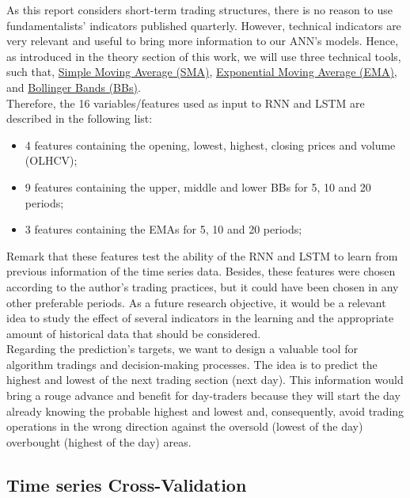 As this report considers short-term trading structures, there is no reason to use fundamentalists' indicators published quarterly. However, technical indicators are very relevant and useful to bring more information to our ANN's models. Hence, as introduced in the theory section of this work, we will use three technical tools, such that, \hyperref[chap:Simple Moving Average (SMA)]{Simple Moving Average (SMA)}, \hyperref[chap:Exponential Moving Average (EMA)]{Exponential Moving Average (EMA)}, and \hyperref[chap:Bollinger Bands (BB)]{Bollinger Bands (BBs)}.\\

Therefore, the 16 variables/features used as input to RNN and LSTM are described in the following list:

\begin{itemize}
\item 4 features containing the opening, lowest, highest, closing prices and volume (OLHCV);
\item 9 features containing the upper, middle and lower BBs for 5, 10 and 20 periods;
\item 3 features containing the EMAs for 5, 10 and 20 periods;
\end{itemize}

Remark that these features test the ability of the RNN and LSTM to learn from previous information of the time series data. Besides, these features were chosen according to the author's trading practices, but it could have been chosen in any other preferable periods. As a future research objective, it would be a relevant idea to study the effect of several indicators in the learning and the appropriate amount of historical data that should be considered.\\

Regarding the prediction's targets, we want to design a valuable tool for algorithm tradings and decision-making processes. The idea is to predict the highest and lowest of the next trading section (next day). This information would bring a rouge advance and benefit for day-traders because they will start the day already knowing the probable highest and lowest and, consequently, avoid trading operations in the wrong direction against the oversold (lowest of the day) overbought (highest of the day) areas.

\subsection{Time series Cross-Validation}
\label{chap:Time series Cross-Validation}

